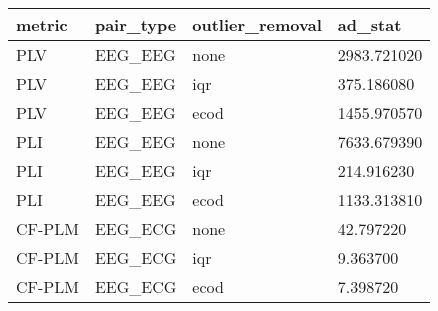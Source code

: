 \begin{tabular}{llll}
\toprule
metric & pair\_type & outlier\_removal & ad\_stat \\
\midrule
PLV & EEG\_EEG & none & 2983.721020 \\
PLV & EEG\_EEG & iqr & 375.186080 \\
PLV & EEG\_EEG & ecod & 1455.970570 \\
PLI & EEG\_EEG & none & 7633.679390 \\
PLI & EEG\_EEG & iqr & 214.916230 \\
PLI & EEG\_EEG & ecod & 1133.313810 \\
CF-PLM & EEG\_ECG & none & 42.797220 \\
CF-PLM & EEG\_ECG & iqr & 9.363700 \\
CF-PLM & EEG\_ECG & ecod & 7.398720 \\
\bottomrule
\end{tabular}
